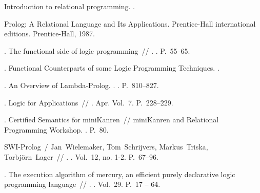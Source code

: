 \begin{thebibliography}{10}
   Introduction to relational programming. \BibDash
  .

   Prolog: A Relational Language and Its Applications.
    Prentice-Hall international editions. \BibDash
  \newblock Prentice-Hall, 1987.

  . The functional side of logic programming~//
    . \BibDash
  . \BibDash
  \newblock P.~55--65.

  . Functional Counterparts of some
    Logic Programming Techniques. \BibDash
  .

  . An Overview of Lambda-Prolog. \BibDash
  . . \BibDash
  \newblock P.~810--827.

  . Logic for Applications~//  \BibDash
  . \BibDash Apr. \BibDash
  \newblock Vol.~7. \BibDash
  \newblock P.~228–229.

  . Certified
    Semantics for miniKanren~// miniKanren and Relational Programming Workshop.
    \BibDash
  . \BibDash
  \newblock P.~80.

  SWI-Prolog~/ Jan~Wielemaker, Tom~Schrijvers, Markus~Triska, Torbjörn~Lager~//
    . \BibDash
  . \BibDash
  \newblock Vol.~12, no. 1-2. \BibDash
  \newblock P.~67–96.

  . The execution
    algorithm of mercury, an efficient purely declarative logic programming
    language~// . \BibDash
  . \BibDash
  \newblock Vol.~29. \BibDash
  \newblock P.~17 -- 64.


\end{thebibliography}
